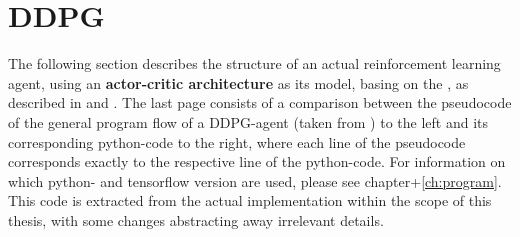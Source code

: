 \section{DDPG}
\label{ap:ddpg}

The following section describes the structure of an actual reinforcement learning agent, using an \textbf{actor-critic architecture} as its model, basing on the , as described in \cite{silver_deterministic_2014} and \cite{lillicrap_continuous_2015}. The last page consists of a comparison between the pseudocode of the general program flow of a DDPG-agent (taken from \cite{lillicrap_continuous_2015}) to the left and its corresponding python-code to the right, where each line of the pseudocode corresponds exactly to the respective line of the python-code. For information on which python- and tensorflow version are used, please see chapter+\ref{ch:program}. This code is extracted from the actual implementation within the scope of this thesis, with some changes abstracting away irrelevant details.\\


\begin{landscape}
	\begin{parcolumns}[distance=0.1em,colwidths={1=33em}]{2}
		\label{ap:ddpg_comparison}
		\colchunk[1]{ }
		\colchunk[2]{  }
	\end{parcolumns}
\end{landscape}




